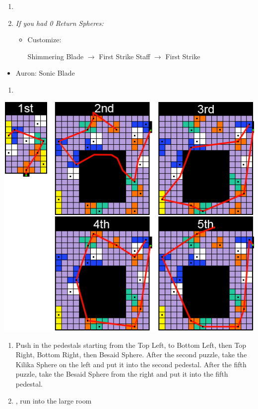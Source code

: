 \begin{enumerate}[resume]
  \item \formation{\tidus}{\auron}{\yuna}

  \item \textit{If you had 0 Return Spheres:}
        \begin{itemize}
          \item Customize:
                \begin{itemize}
                  \auronf Shimmering Blade $\rightarrow$ First Strike
                  \yunaf Staff $\rightarrow$ First Strike
                \end{itemize}
        \end{itemize}
        \end{enumerate}
        \begin{equip}
  \begin{itemize}
    \item Auron: Sonic Blade
  \end{itemize}
\end{equip}
\begin{enumerate}[resume]
  \item {\large \save}
\end{enumerate}
\includegraphics[width=.95\columnwidth]{graphics/Zanarkand_Trials}
\begin{enumerate}[resume]
  \item Push in the pedestals starting from the Top Left, to Bottom Left, then Top Right, Bottom Right, then Besaid Sphere. After the second puzzle, take the Kilika Sphere on the left and put it into the second pedestal. After the fifth puzzle, take the Besaid Sphere from the right and put it into the fifth pedestal.
  \item \cs, run into the large room
\end{enumerate}

